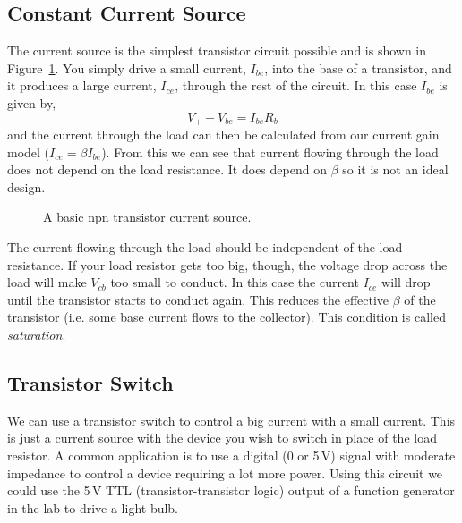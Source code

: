 \documentclass{article}
\begin{document}
\subsection{Constant Current Source}
The current source is the simplest transistor circuit possible and is shown in Figure~\ref{fig:npn_current_source}. You simply drive a small current, $I_{be}$, into the base of a transistor, and it produces a large current, $I_{ce}$, through the rest of the circuit. In this case $I_{be}$ is given by,
\begin{equation}
V_+ - V_{be} = I_{be} R_b
\end{equation}
and the current through the load can then be calculated from our current gain model ($I_{ce} = \beta I_{be}$). From this we can see that current flowing through the load does not depend on the load resistance. It does depend on $\beta$ so it is not an ideal design.

\begin{figure}
\begin{center}
\end{center}
\caption{A basic npn transistor current source.}
\label{fig:npn_current_source}
\end{figure}

The current flowing through the load should be independent of the load resistance. If your load resistor gets too big, though, the voltage drop across the load will make $V_{cb}$ too small to conduct. In this case the current $I_{ce}$ will drop until the transistor starts to conduct again. This reduces the effective $\beta$ of the transistor (i.e. some base current flows to the collector). This condition is called \emph{saturation}.

\subsection{Transistor Switch}
We can use a transistor switch to control a big current with a small current. This is just a current source with the device you wish to switch in place of the load resistor. A common application is to use a digital (0 or 5\,V) signal with moderate impedance to control a device requiring a lot more power. Using this circuit we could use the 5\,V TTL (transistor-transistor logic) output of a function generator in the lab to drive a light bulb.
\end{document}
